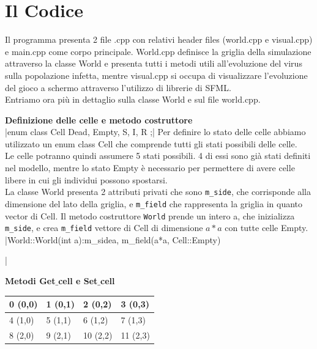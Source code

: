 \documentclass{article}
\begin{document}
\section{Il Codice}

\hspace{\parindent}Il programma presenta 2 file .cpp con relativi header files
(world.cpp e visual.cpp) e main.cpp come corpo principale. 
World.cpp definisce la griglia della simulazione attraverso la classe World e 
presenta tutti i metodi utili all'evoluzione del virus sulla popolazione infetta, 
mentre visual.cpp si occupa di visualizzare l'evoluzione del gioco a schermo 
attraverso l'utilizzo di librerie di SFML. \\
Entriamo ora più in dettaglio sulla classe World e sul file world.cpp. 

\begin{enumerate}
    \item \textbf{Definizione delle celle e metodo costruttore}\\
    |enum class Cell {Dead, Empty, S, I, R };|
    Per definire lo stato delle celle abbiamo utilizzato un enum class Cell che 
    comprende tutti gli stati possibili delle celle. \\
    Le celle potranno quindi assumere 5 stati possibili. 4 di essi sono già stati 
    definiti nel modello, mentre lo stato Empty è necessario per permettere di avere 
    celle libere in cui gli individui possono spostarsi. \\
    La classe World presenta 2 attributi privati che sono \verb|m_side|, che 
    corrisponde alla dimensione del lato della griglia, e \verb|m_field| che 
    rappresenta la griglia in quanto vector di Cell. Il metodo costruttore \verb|World| 
    prende un intero a, che inizializza \verb|m_side|, e crea \verb|m_field| vettore 
    di Cell di dimensione $a*a$ con tutte celle Empty. 
    |World::World(int a):m_side{a}, m_field(a*a, Cell::Empty){|
    \item \textbf{Metodi Get$\_$cell e Set$\_$cell}\\
    \begin{center}
    \begin{tabular}{ | m{4em} | m{4em} | m{4em} | m{4em} |}
        \hline 
        0 (0,0) & 1 (0,1) & 2 (0,2) & 3 (0,3) \\
        \hline
        4 (1,0) & 5 (1,1) & 6 (1,2) & 7 (1,3) \\
        \hline 
        8 (2,0) & 9 (2,1) & 10 (2,2) & 11 (2,3) \\

\end{tabular}
\end{center}}
\end{enumerate}
\end{document}

